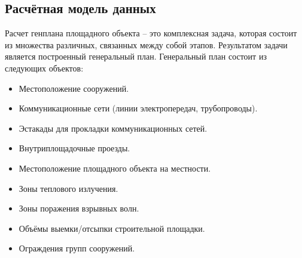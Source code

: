 \subsection{\large{Расчётная модель данных}}

Расчет генплана площадного объекта -- это комплексная задача, которая состоит из множества различных,
связанных между собой этапов. Результатом задачи является построенный генеральный план.
Генеральный план состоит из следующих объектов:
\begin{itemize}
	\item Местоположение сооружений.
	\item Коммуникационные сети (линии электропередач, трубопроводы).
	\item Эстакады для прокладки коммуникационных сетей.
	\item Внутриплощадочные проезды.
	\item Местоположение площадного объекта на местности.
	\item Зоны теплового излучения.
	\item Зоны поражения взрывных волн.
	\item Объёмы выемки/отсыпки строительной площадки.
	\item Ограждения групп сооружений.
\end{itemize}